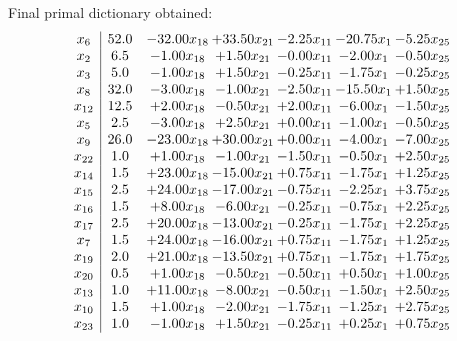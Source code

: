 \documentclass[8pt]{article}
\begin{document}
 Final primal dictionary obtained: 
\[\begin{array}{c| c c@{\hskip 2pt} c@{\hskip 2pt} c@{\hskip 2pt} c@{\hskip 2pt} c@{\hskip 2pt} }
 x_{6}   &  52.0 & -32.00 x_{18} & + 33.50 x_{21} & -2.25 x_{11} & -20.75 x_{1} & -5.25 x_{25}\\
 x_{2}   &  6.5 & -1.00 x_{18} & +  1.50 x_{21} & -0.00 x_{11} & -2.00 x_{1} & -0.50 x_{25}\\
 x_{3}   &  5.0 & -1.00 x_{18} & +  1.50 x_{21} & -0.25 x_{11} & -1.75 x_{1} & -0.25 x_{25}\\
 x_{8}   &  32.0 & -3.00 x_{18} & -1.00 x_{21} & -2.50 x_{11} & -15.50 x_{1} & +  1.50 x_{25}\\
 x_{12}   &  12.5 & +  2.00 x_{18} & -0.50 x_{21} & +  2.00 x_{11} & -6.00 x_{1} & -1.50 x_{25}\\
 x_{5}   &  2.5 & -3.00 x_{18} & +  2.50 x_{21} & +  0.00 x_{11} & -1.00 x_{1} & -0.50 x_{25}\\
 x_{9}   &  26.0 & -23.00 x_{18} & + 30.00 x_{21} & +  0.00 x_{11} & -4.00 x_{1} & -7.00 x_{25}\\
 x_{22}   &  1.0 & +  1.00 x_{18} & -1.00 x_{21} & -1.50 x_{11} & -0.50 x_{1} & +  2.50 x_{25}\\
 x_{14}   &  1.5 & + 23.00 x_{18} & -15.00 x_{21} & +  0.75 x_{11} & -1.75 x_{1} & +  1.25 x_{25}\\
 x_{15}   &  2.5 & + 24.00 x_{18} & -17.00 x_{21} & -0.75 x_{11} & -2.25 x_{1} & +  3.75 x_{25}\\
 x_{16}   &  1.5 & +  8.00 x_{18} & -6.00 x_{21} & -0.25 x_{11} & -0.75 x_{1} & +  2.25 x_{25}\\
 x_{17}   &  2.5 & + 20.00 x_{18} & -13.00 x_{21} & -0.25 x_{11} & -1.75 x_{1} & +  2.25 x_{25}\\
 x_{7}   &  1.5 & + 24.00 x_{18} & -16.00 x_{21} & +  0.75 x_{11} & -1.75 x_{1} & +  1.25 x_{25}\\
 x_{19}   &  2.0 & + 21.00 x_{18} & -13.50 x_{21} & +  0.75 x_{11} & -1.75 x_{1} & +  1.75 x_{25}\\
 x_{20}   &  0.5 & +  1.00 x_{18} & -0.50 x_{21} & -0.50 x_{11} & +  0.50 x_{1} & +  1.00 x_{25}\\
 x_{13}   &  1.0 & + 11.00 x_{18} & -8.00 x_{21} & -0.50 x_{11} & -1.50 x_{1} & +  2.50 x_{25}\\
 x_{10}   &  1.5 & +  1.00 x_{18} & -2.00 x_{21} & -1.75 x_{11} & -1.25 x_{1} & +  2.75 x_{25}\\
 x_{23}   &  1.0 & -1.00 x_{18} & +  1.50 x_{21} & -0.25 x_{11} & +  0.25 x_{1} & +  0.75 x_{25}\\

\end{array}\]
\end{document}
